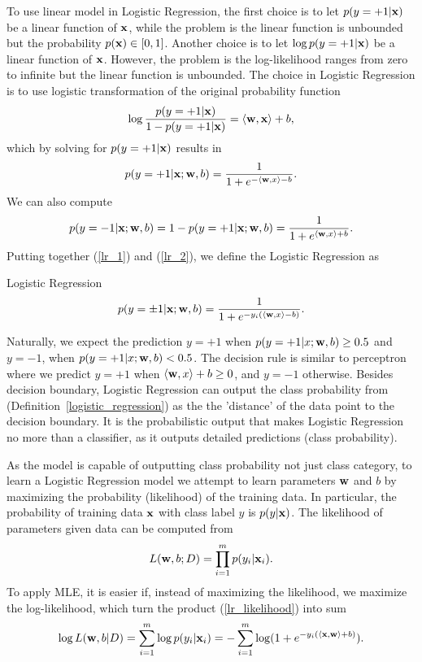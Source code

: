 To use linear model in Logistic Regression, the first choice is to let $p(y=+1|\mathbf {x})$ be a linear function of $\mathbf {x}$, while the problem is the linear function is unbounded but the probability $p(\mathbf {x})\in[0,1]$.
Another choice is to let $\log p(y=+1|\mathbf {x})$ be a linear function of $\mathbf {x}$. 
However, the problem is the log-likelihood ranges from zero to infinite but the linear function is unbounded.
The choice in Logistic Regression is to use logistic transformation of the original probability function
\begin{align*}
	\log\frac{p(y=+1|\mathbf {x})}{1-p(y=+1|\mathbf {x})} = \langle \mathbf {w}, \mathbf {x} \rangle + b,
\end{align*}
which by solving for $p(y=+1|\mathbf {x})$ results in 
\begin{align}
	p(y=+1|\mathbf {x};\mathbf {w},b) = \frac{1}{1+e^{ -\langle \mathbf {w}, x \rangle-b }}. \label{lr_1}
\end{align}
We can also compute
\begin{align}
	p(y=-1|\mathbf {x};\mathbf {w},b)=1-p(y=+1|\mathbf {x};\mathbf {w},b)=\frac{1}{1+e^{ \langle \mathbf {w}, x \rangle+b }}. \label{lr_2}
\end{align}
Putting together (\ref{lr_1}) and (\ref{lr_2}), we define the Logistic Regression as
\begin{definition}{Logistic Regression}\label{logistic_regression}
	\begin{align*}
		p(y=\pm1|\mathbf {x};\mathbf {w},b) = \frac{1}{1+e^{ -y_i(\langle \mathbf {w}, x \rangle-b) }}.
	\end{align*}
\end{definition}
Naturally, we expect the prediction $y=+1$ when $p(y=+1|x;\mathbf {w},b)\ge0.5$ and $y=-1$, when $p(y=+1|x;\mathbf {w},b)<0.5$.
The decision rule is similar to perceptron where we predict $y=+1$ when $\langle \mathbf {w}, x \rangle+b\ge0$, and $y=-1$ otherwise.
Besides decision boundary, Logistic Regression can output the class probability from (Definition~\ref{logistic_regression}) as the the 'distance' of the data point to the decision boundary.
It is the probabilistic output that makes Logistic Regression no more than a classifier, as it outputs detailed predictions (class probability).

As the model is capable of outputting class probability not just class category, to learn a Logistic Regression model we attempt to learn parameters $\mathbf {w}$ and $b$ by maximizing the probability (likelihood) of the training data.
In particular, the probability of training data $\mathbf {x}$ with class label $y$ is $p(y|\mathbf {x})$.
The likelihood of parameters given data can be computed from
\begin{align}
	L(\mathbf {w},b;D) = \prod_{i=1}^mp(y_i|\mathbf {x}_i). \label{lr_likelihood}
\end{align}
To apply MLE, it is easier if, instead of maximizing the likelihood, we maximize the log-likelihood, which turn the product (\ref{lr_likelihood}) into sum
\begin{align}
	\log L(\mathbf {w},b|D) = \sum_{i=1}^{m}\log p(y_i|\mathbf {x}_i) = -\sum_{i=1}^{m}\log (1+e^{ -y_i(\langle \mathbf {x}, \mathbf {w} \rangle+b) }) \label{lr_likelihood_sum}.
\end{align}

